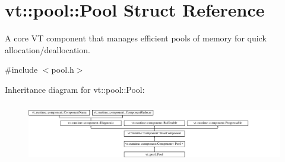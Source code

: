 \hypertarget{structvt_1_1pool_1_1_pool}{}\section{vt\+:\+:pool\+:\+:Pool Struct Reference}
\label{structvt_1_1pool_1_1_pool}


A core VT component that manages efficient pools of memory for quick allocation/deallocation.  




{\ttfamily \#include $<$pool.\+h$>$}

Inheritance diagram for vt\+:\+:pool\+:\+:Pool\+:\begin{figure}[H]
\begin{center}
\leavevmode
\includegraphics[height=2.671756cm]{structvt_1_1pool_1_1_pool}
\end{center}
\end{figure}
